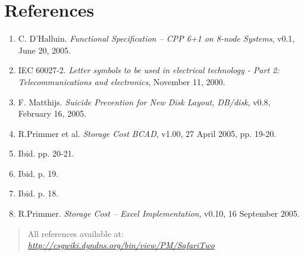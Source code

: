 \section{References}\label{references-1}

\begin{enumerate}
\renewcommand{\labelenumi}{[\arabic{enumi}]}
\tightlist
\item\label{ref:1}
  C. D'Halluin. \emph{Functional Specification -- CPP 6+1 on 8-node Systems}, v0.1, June 20, 2005.
\item\label{ref:2}
  IEC 60027-2. \emph{Letter symbols to be used in electrical technology - Part 2: Telecommunications and electronics}, November 11, 2000.
\item\label{ref:3}
  F. Matthijs. \emph{Suicide Prevention for New Disk Layout, DB/disk}, v0.8, February 16, 2005.
\item\label{ref:4}
  R.Primmer et al. \emph{Storage Cost BCAD}, v1.00, 27 April 2005, pp. 19-20.
\item\label{ref:5}
  Ibid. pp. 20-21.
\item\label{ref:6}
  Ibid. p. 19.
\item\label{ref:7}
  Ibid. p. 18.
\item\label{ref:8}
  R.Primmer. \emph{Storage Cost -- Excel Implementation}, v0.10, 16 September 2005.
\end{enumerate}

\begin{quote}
All references available at: \href{http://csgwiki.dyndns.org/bin/view/PM/SafariTwo}{\emph{http://csgwiki.dyndns.org/bin/view/PM/SafariTwo}}
\end{quote}
